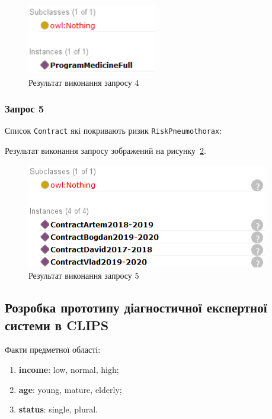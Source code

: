 \begin{figure}[H]
	\centering
	    \includegraphics{dl_2}
	\caption{Результат виконання запросу 4}
	\label{fig:dl_2}
\end{figure}

\subsubsection*{Запрос 5}
Список \texttt{Contract} які покривають ризик \texttt{RiskPneumothorax}:
 

Результат виконання запросу зображений на рисунку~\ref{fig:dl_3}.

\begin{figure}[H]
	\centering
	    \includegraphics{dl_3}
	\caption{Результат виконання запросу 5}
	\label{fig:dl_3}
\end{figure}

\subsection{Розробка прототипу діагностичної експертної системи в CLIPS}
Факти предметної області:
\begin{enumerate}
	\item \textbf{income}: low, normal, high; 
	\item \textbf{age}: young, mature, elderly;
	\item \textbf{status}: single, plural.
\end{enumerate}

